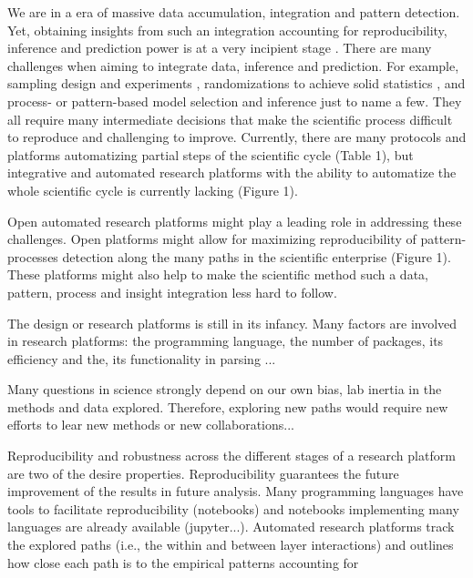 \documentclass[english,12pt]{article}
\begin{document}
We are in a era of massive data accumulation, integration and pattern
detection. Yet, obtaining insights from such an integration accounting
for reproducibility, inference and prediction power is at a very
incipient stage \citep{Ioannidis2005}. There are many challenges when
aiming to integrate data, inference and prediction. For example,
sampling design and experiments 
\citep{Voelkl2018}, randomizations to achieve solid statistics
, and process- or pattern-based model
selection and inference  just to name a
few. They all require many intermediate decisions that make the
scientific process difficult to reproduce and challenging to
improve. Currently, there are many protocols and platforms
automatizing partial steps of the scientific cycle (Table 1), but
integrative and automated research platforms with the ability to
automatize the whole scientific cycle is currently lacking (Figure
1).


Open automated research platforms  might play a leading role in addressing these
challenges. Open platforms might allow for maximizing reproducibility
of pattern-processes detection along the many paths in the scientific
enterprise (Figure 1). These platforms might also help to make the
scientific method such a data, pattern, process and insight
integration less hard to follow.

The design or research platforms is still in its infancy. Many factors
are involved in research platforms: the programming language, the
number of packages, its efficiency and the, its functionality in parsing ...


Many questions in science strongly depend on our own bias, lab inertia
in the methods and data explored. Therefore, exploring new paths would
require new efforts to lear new methods or new collaborations...

Reproducibility and robustness across the different stages of a
research platform are two of the desire properties. Reproducibility
guarantees the future improvement of the results in future
analysis. Many programming languages have tools to facilitate
reproducibility (notebooks) and notebooks implementing many languages
are already available (jupyter...). Automated research platforms track
the explored paths (i.e., the within and between layer interactions)
and outlines how close each path is to the empirical patterns
accounting for
\end{document}
